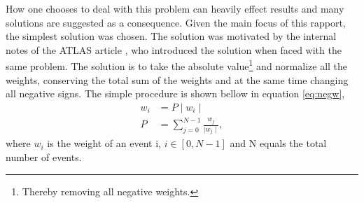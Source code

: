 How one chooses to deal with this problem can heavily effect results and many solutions 
are suggested as a consequence. Given the main focus of this rapport, the 
simplest solution was chosen. The solution was motivated by the internal notes of 
the ATLAS article \cite{Aad:2800889}, who introduced the solution when faced with the same 
problem. The solution is to take the absolute value\footnote{Thereby removing all negative weights.} 
and normalize all the weights, conserving the total sum of the weights and at the same time changing all 
negative signs. The simple procedure is shown bellow in equation \ref{eq:negw},
\begin{align}\label{eq:negw}
    w_i & = P \mid w_i \mid\,  \\
    P  & =  \sum_{j=0}^{N-1}\frac{ w_j}{\mid w_j \mid},
\end{align}
where $w_i$ is the weight of an event i, $i \in [0,N-1]$ and N equals the total number of events.



